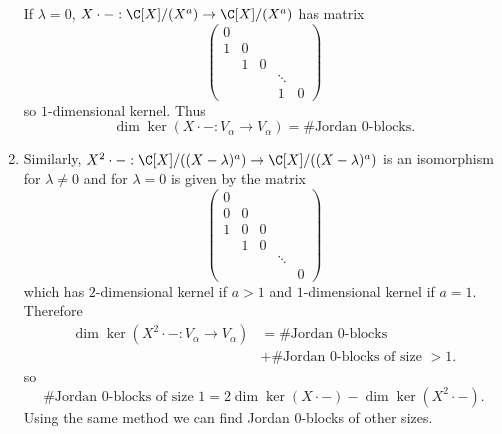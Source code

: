 \documentclass[a4paper]{article}
\begin{document}
\begin{remark}
\begin{enumerate}
    If \(\lambda = 0\), \(X \cdot -: \C[X]/(X^a) \to \C[X]/(X^a)\) has matrix
    \[
      \begin{pmatrix}
        0 \\
        1 & 0 \\
        & 1 & 0 \\
        & & & \ddots \\
        & & & 1 & 0
      \end{pmatrix}
    \]
    so \(1\)-dimensional kernel. Thus
    \[
      \dim \ker (X \cdot -: V_\alpha \to V_\alpha) = \# \text{Jordan \(0\)-blocks}.
    \]
  \item Similarly, \(X^2 \cdot -: \C[X]/((X - \lambda)^a) \to \C[X]/((X - \lambda)^a)\) is an isomorphism for \(\lambda \neq 0\) and for \(\lambda = 0\) is given by the matrix
    \[
      \begin{pmatrix}
        0 \\
        0 & 0 \\
        1 & 0 & 0 \\
        & 1 & 0 & \\
        & & & \ddots \\
        & & & & 0
      \end{pmatrix}
    \]
    which has \(2\)-dimensional kernel if \(a > 1\) and \(1\)-dimensional kernel if \(a = 1\). Therefore
    \begin{align*}
      \dim \ker (X^2 \cdot -: V_\alpha \to V_\alpha) &= \# \text{Jordan \(0\)-blocks} \\
                                                     &+ \# \text{Jordan \(0\)-blocks of size \(> 1\)}.
    \end{align*}
    so
    \[
      \# \text{Jordan \(0\)-blocks of size \(1\)} = 2 \dim \ker (X \cdot -) - \dim \ker (X^2 \cdot -).
    \]
    Using the same method we can find Jordan \(0\)-blocks of other sizes.
    \iffalse
    \begin{align*}
      \dim (X^r \cdot -: V_\alpha \to V_\alpha) &= \# \text{Jordan \(0\)-blocks} \\
                                                &+ \sum_{i = 1}^{r - 1} \# \text{Jordan \(0\)-blocks of size \(> i\)} \\
      \sum_{i = 1}^{r - 1} \# \text{blocks of size \(\leq i\)} &= r \cdot \dim \ker (X \cdot -) - \dim \ker (X^r \cdot -) \\
      \# \text{blocks of size \(\leq r - 1\)} &= r \cdot \dim \ker (X \cdot -) - \dim \ker (X^r \cdot -) \\
                                                &- (r - 1) \cdot \dim \ker (X \cdot -) + \dim \ker (X^{r - 1} \cdot -) \\
                                                &= \dim \ker (X \cdot -) - \dim \ker (X^r \cdot -) + \dim \ker (X^{r - 1} \cdot -) \\
      \# \text{blocks of size \(r\)} &= 2 \cdot \dim \ker (X^r \cdot -) - \dim \ker (X^{r + 1} \cdot -) - \dim \ker(X^{r - 1} \cdot -)
    \end{align*}
    \fi
  \end{enumerate}
\end{remark}
\end{document}
